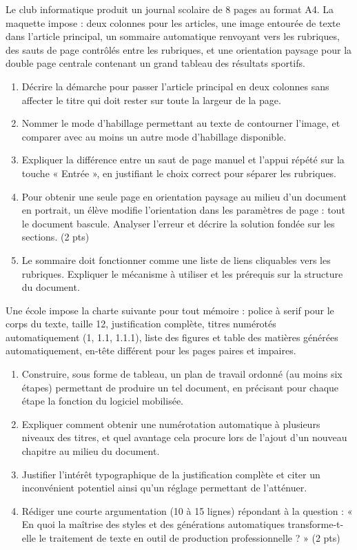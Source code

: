 \documentclass[11pt]{article}
\begin{document}
\begin{exercice}
Le club informatique produit un journal scolaire de 8 pages au format A4. La maquette impose : deux colonnes pour les articles, une image entourée de texte dans l'article principal, un sommaire automatique renvoyant vers les rubriques, des sauts de page contrôlés entre les rubriques, et une orientation paysage pour la double page centrale contenant un grand tableau des résultats sportifs.
\begin{enumerate}
\item Décrire la démarche pour passer l'article principal en deux colonnes sans affecter le titre qui doit rester sur toute la largeur de la page.
\item Nommer le mode d'habillage permettant au texte de contourner l'image, et comparer avec au moins un autre mode d'habillage disponible.
\item Expliquer la différence entre un saut de page manuel et l'appui répété sur la touche « Entrée », en justifiant le choix correct pour séparer les rubriques.
\item Pour obtenir une seule page en orientation paysage au milieu d'un document en portrait, un élève modifie l'orientation dans les paramètres de page : tout le document bascule. Analyser l'erreur et décrire la solution fondée sur les sections. (2 pts)
\item Le sommaire doit fonctionner comme une liste de liens cliquables vers les rubriques. Expliquer le mécanisme à utiliser et les prérequis sur la structure du document.
\end{enumerate}
\end{exercice}

\begin{exercice}
Une école impose la charte suivante pour tout mémoire : police à serif pour le corps du texte, taille 12, justification complète, titres numérotés automatiquement (1, 1.1, 1.1.1), liste des figures et table des matières générées automatiquement, en-tête différent pour les pages paires et impaires.
\begin{enumerate}
\item Construire, sous forme de tableau, un plan de travail ordonné (au moins six étapes) permettant de produire un tel document, en précisant pour chaque étape la fonction du logiciel mobilisée.
\item Expliquer comment obtenir une numérotation automatique à plusieurs niveaux des titres, et quel avantage cela procure lors de l'ajout d'un nouveau chapitre au milieu du document.
\item Justifier l'intérêt typographique de la justification complète et citer un inconvénient potentiel ainsi qu'un réglage permettant de l'atténuer.
\item Rédiger une courte argumentation (10 à 15 lignes) répondant à la question : « En quoi la maîtrise des styles et des générations automatiques transforme-t-elle le traitement de texte en outil de production professionnelle ? » (2 pts)
\end{enumerate}
\end{exercice}
\end{document}
